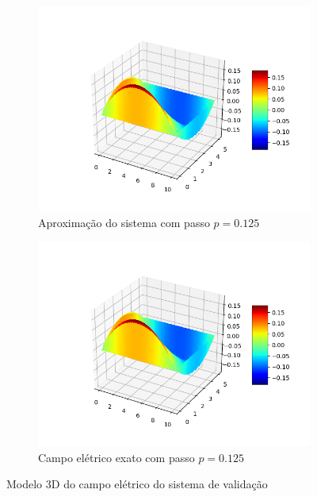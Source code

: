 \documentclass[oneside]{abntex2}
\begin{document}
\begin{figure}[h]
  \begin{subfigure}[b]{0.5\textwidth}
    \includegraphics[width=\textwidth]{imgs/3d_aprox_val_elet_1250.png}
    \caption{Aproximação do sistema com passo $p = 0.125$}
    \label{3d_aprox_val_1250}
  \end{subfigure}
  \begin{subfigure}[b]{0.5\textwidth}
    \includegraphics[width=\textwidth]{imgs/3d_grnd_val_elet_1250.png}
    \caption{Campo elétrico exato com passo $p = 0.125$}
    \label{3d_exat_val_1250}
  \end{subfigure}
  \caption{Modelo 3D do campo elétrico do sistema de validação}
\end{figure}
\end{document}
